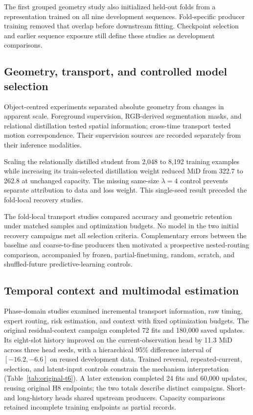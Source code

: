 The first grouped geometry study also initialized held-out folds from a representation trained on all nine development sequences. Fold-specific producer training removed that overlap before downstream fitting. Checkpoint selection and earlier sequence exposure still define these studies as development comparisons. 

\subsection{Geometry, transport, and controlled model selection}
Object-centred experiments separated absolute geometry from changes in apparent scale. Foreground supervision, RGB-derived segmentation masks, and relational distillation tested spatial information; cross-time transport tested motion correspondence. Their supervision sources are recorded separately from their inference modalities.

Scaling the relationally distilled student from 2,048 to 8,192 training examples while increasing its train-selected distillation weight reduced MiD from 322.7 to 262.8 at unchanged capacity. The missing same-size $\lambda=4$ control prevents separate attribution to data and loss weight. This single-seed result preceded the fold-local recovery studies. 

The fold-local transport studies compared accuracy and geometric retention under matched samples and optimization budgets. No model in the two initial recovery campaigns met all selection criteria. Complementary errors between the baseline and coarse-to-fine producers then motivated a prospective nested-routing comparison, accompanied by frozen, partial-finetuning, random, scratch, and shuffled-future predictive-learning controls. 

\subsection{Temporal context and multimodal estimation}
Phase-domain studies examined incremental transport information, raw timing, expert routing, risk estimation, and context with fixed optimization budgets. The original residual-context campaign completed 72 fits and 180,000 saved updates. Its eight-slot history improved on the current-observation head by 11.3 MiD across three head seeds, with a hierarchical 95\% difference interval of $[-16.2,-6.6]$ on reused development data. Trained reversal, repeated-current, selection, and latent-input controls constrain the mechanism interpretation (Table~\ref{tab:original-t6}). A later extension completed 24 fits and 60,000 updates, reusing original H8 endpoints; the two totals describe distinct campaigns. Short- and long-history heads shared upstream producers. Capacity comparisons retained incomplete training endpoints as partial records. 

